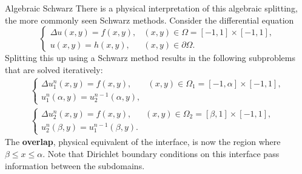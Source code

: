 \documentclass{beamer}
\begin{document}
\begin{frame}{Algebraic Schwarz}
There is a physical interpretation of this algebraic splitting, the more commonly seen Schwarz methods.
Consider the differential equation
\begin{equation*}
	\begin{cases} \Delta u(x,y) = f(x,y), & (x,y) \in \Omega = [-1,1] \times [-1,1], \\ u(x,y)=h(x,y), & (x,y) \in \partial \Omega. \end{cases}
\end{equation*}
Splitting this up using a Schwarz method results in the following subproblems that are solved iteratively:
\begin{align*}
	\begin{cases} \Delta u_1^n(x,y) = f(x,y), & (x,y) \in \Omega_1 = [-1,\alpha] \times [-1,1], \\ u_1^n(\alpha,y)=u_2^{n-1}(\alpha,y), \end{cases} \\
	\begin{cases} \Delta u_2^n(x,y) = f(x,y), & (x,y) \in \Omega_2 = [\beta,1] \times [-1,1], \\ u_2^n(\beta,y)=u_1^{n-1}(\beta,y). \end{cases}
\end{align*}
The \textbf{overlap}, physical equivalent of the interface, is now the region where $\beta \leq x \leq \alpha$.
Note that Dirichlet boundary conditions on this interface pass information between the subdomains.
\end{frame}
\end{document}
